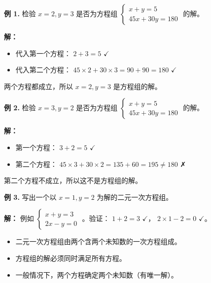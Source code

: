 \begin{workedexamples}


\textbf{例 1.} 检验 $x = 2, y = 3$ 是否为方程组 $\begin{cases} x + y = 5 \\ 45x + 30y = 180 \end{cases}$ 的解。

\textbf{解：}

\begin{itemize}
  \item 代入第一个方程： $2 + 3 = 5$ $\checkmark$
  \item 代入第二个方程： $45 \times 2 + 30 \times 3 = 90 + 90 = 180$ $\checkmark$
\end{itemize}


两个方程都成立，所以 $x = 2, y = 3$ 是方程组的解。

\textbf{例 2.} 检验 $x = 3, y = 2$ 是否为方程组 $\begin{cases} x + y = 5 \\ 45x + 30y = 180 \end{cases}$ 的解。

\textbf{解：}

\begin{itemize}
  \item 第一个方程： $3 + 2 = 5$ $\checkmark$
  \item 第二个方程： $45 \times 3 + 30 \times 2 = 135 + 60 = 195 \neq 180$ ✗
\end{itemize}


第二个方程不成立，所以这不是方程组的解。

\textbf{例 3.} 写出一个以 $x = 1, y = 2$ 为解的二元一次方程组。

\textbf{解：} 例如 $\begin{cases} x + y = 3 \\ 2x - y = 0 \end{cases}$ 。验证： $1 + 2 = 3$ $\checkmark$， $2 \times 1 - 2 = 0$ $\checkmark$。

\end{workedexamples}

\begin{keytakeaway}


\begin{itemize}
  \item 二元一次方程组由两个含两个未知数的一次方程组成。
  \item 方程组的解必须同时满足所有方程。
  \item 一般情况下，两个方程确定两个未知数（有唯一解）。
\end{itemize}


\end{keytakeaway}

